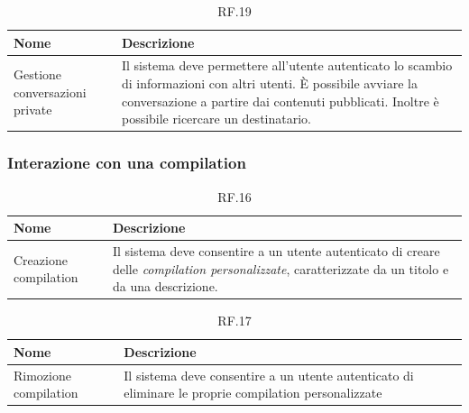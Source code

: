 \documentclass{natourDoc}
\begin{document}
\begin{table}[H]
	\centering
	\begin{tabular}{ |p{5cm}|p{10.3cm}| }
		\hline
		\rowcolor{PineGreen!70}
		\textbf{Nome}                  & \textbf{Descrizione}                                                                           \\
		\hline
		Gestione conversazioni private & Il sistema deve permettere all'utente autenticato lo scambio di informazioni con altri utenti.
		È possibile avviare la conversazione a partire dai contenuti pubblicati. Inoltre è possibile ricercare un destinatario.         \\
		\hline
	\end{tabular}
	\caption{RF.19}
	\label{table:19}
\end{table}

\subsubsection{Interazione con una compilation}
\begin{table}[H]
	\centering
	\begin{tabular}{ |p{5cm}|p{10.3cm}| }
		\hline
		\rowcolor{PineGreen!70}
		\textbf{Nome}         & \textbf{Descrizione}                                                                                    \\
		\hline
		Creazione compilation & Il sistema deve consentire a un utente autenticato di creare delle \textit{compilation personalizzate},
		caratterizzate da un titolo e da una descrizione.                                                                               \\
		\hline
	\end{tabular}
	\caption{RF.16}
	\label{table:16}
\end{table}

\begin{table}[H]
	\centering
	\begin{tabular}{ |p{5cm}|p{10.3cm}| }
		\hline
		\rowcolor{PineGreen!70}
		\textbf{Nome}         & \textbf{Descrizione}                                                       \\
		\hline
		Rimozione compilation & Il sistema deve consentire a un utente autenticato di eliminare le proprie
		compilation personalizzate                                                                         \\
		\hline
	\end{tabular}
	\caption{RF.17}
	\label{table:17}
\end{table}
\end{document}
